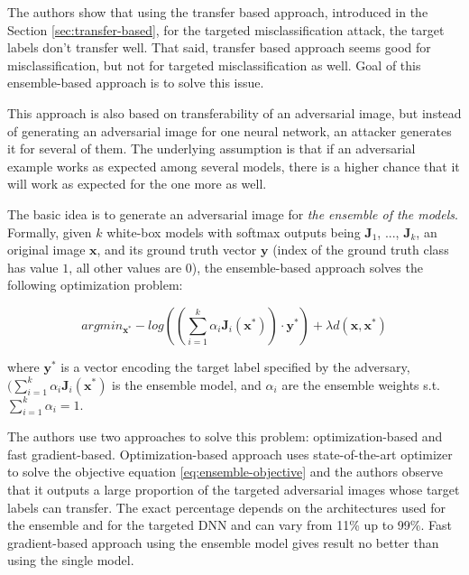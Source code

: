 The authors \cite{ensemble-attack} show that using the transfer based approach, introduced in the Section \ref{sec:transfer-based}, for the targeted misclassification attack, the target labels don't transfer well. That said, transfer based approach seems good for misclassification, but not for targeted misclassification as well. Goal of this ensemble-based approach is to solve this issue.

This approach is also based on transferability of an adversarial image, but instead of generating an adversarial image for one neural network, an attacker generates it for several of them. The underlying assumption is that if an adversarial example works as expected among several models, there is a higher chance that it will work as expected for the one more as well. 

The basic idea is to generate an adversarial image for \textit{the ensemble of the models}. Formally, given $k$ white-box models with softmax outputs being $\pmb J_1$, ..., $\pmb J_k$, an original image $\pmb x$, and its ground truth vector $\pmb y$ (index of the ground truth class has value $1$, all other values are $0$), the ensemble-based approach solves the following optimization problem:

\begin{equation}\label{eq:ensemble-objective}
argmin_{\pmb x^*} - log ((\sum_{i=1}^k \alpha_i \pmb J_i(\pmb x^*)) \cdot \pmb y^*) + \lambda d(\pmb x, \pmb x^*)
\end{equation}

where $\pmb y^*$ is a vector encoding the target label specified by the adversary, $(\sum_{i=1}^k \alpha_i \pmb J_i(\pmb x^*)$ is the ensemble model, and $\alpha_i$ are the ensemble weights s.t. $\sum_{i=1}^k \alpha_i = 1$.

The authors use two approaches to solve this problem: optimization-based and fast gradient-based. Optimization-based approach uses state-of-the-art optimizer to solve the objective equation \ref{eq:ensemble-objective} and the authors observe that it outputs  a large proportion of the targeted adversarial images whose target labels can transfer. The exact percentage depends on the architectures used for the ensemble and for the targeted DNN and can vary from 11\% up to 99\%. Fast gradient-based approach using the ensemble model gives result no better than using the single model.